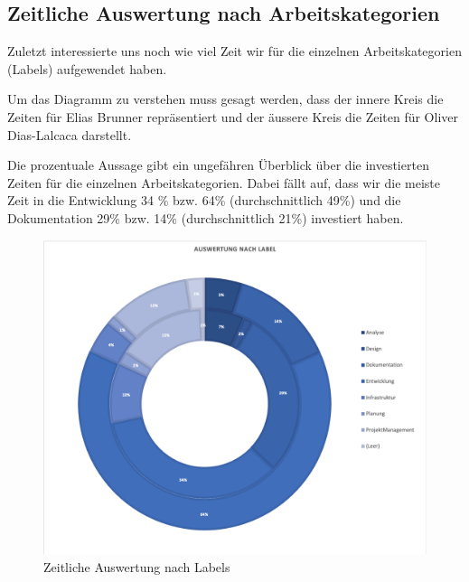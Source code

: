 \subsection{Zeitliche Auswertung nach Arbeitskategorien}
Zuletzt interessierte uns noch wie viel Zeit wir für die einzelnen Arbeitskategorien (Labels) aufgewendet haben.

Um das Diagramm zu verstehen muss gesagt werden, dass der innere Kreis die Zeiten für Elias Brunner repräsentiert und der äussere Kreis die Zeiten für Oliver Dias-Lalcaca darstellt. 

Die prozentuale Aussage gibt ein ungefähren Überblick über die investierten Zeiten für die einzelnen Arbeitskategorien. Dabei fällt auf, dass wir die meiste Zeit in die Entwicklung 34 \% bzw. 64\% (durchschnittlich 49\%) und die Dokumentation 29\% bzw. 14\% (durchschnittlich 21\%) investiert haben.

\begin{figure}[h]
	\centering
	\includegraphics[width=1\linewidth]{./img/zeitauswertung/ZeitauswertungLabel}
	\caption{Zeitliche Auswertung nach Labels}
	\label{fig:comparison-labels}
\end{figure}